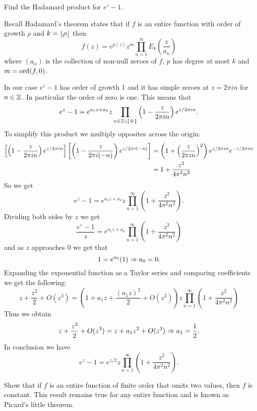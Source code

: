 \documentclass[12pt]{memoir}
\begin{document}
\begin{Ej}
   Find the Hadamard product for $e^z-1$.
\end{Ej}

\begin{ptcbr}
Recall Hadamard's theorem states that if $f$ is an entire function with order of growth $\rho$ and $k=\lfloor\rho\rfloor$ then 
$$f(z)=e^{p(z)}z^m\prod_{n=1}^{\infty}E_k\left(\frac{z}{a_n}\right)$$
where $(a_n)$ is the collection of non-null zeroes of $f$, $p$ has degree at most $k$ and $m=\operatorname{ord}(f,0)$.\par 
In our case $e^z-1$ has order of growth 1 and it has simple zeroes at $z=2\pi i n$ for $n\in\mathbb{Z}$. In particular the order of zero is one. This means that 
$$e^z-1=e^{a_1z+a_0}z\prod_{n\in\mathbb{Z}\setminus\{\,0\,\}}\left(1-\frac{z}{2\pi i n}\right)e^{z/2\pi i n}.$$
To simplify this product we multiply opposites across the origin:
\begin{align*}
\left\lbrack\left(1-\frac{z}{2\pi i n}\right)e^{z/2\pi i n}\right\rbrack\left\lbrack\left(1-\frac{z}{2\pi i (-n)}\right)e^{z/2\pi i (-n)}\right\rbrack&=\left(1+\left(\frac{z}{2\pi i n}\right)^2\right)e^{z/2\pi i n}e^{-z/2\pi i n}\\
&=1+\frac{z^2}{4\pi^2n^2}   
\end{align*}
So we get
$$e^z-1=e^{a_1z+a_0}z\prod_{n=1}^\infty\left(1+\frac{z^2}{4\pi^2n^2} \right).$$ 
Dividing both sides by $z$ we get 
$$\frac{e^z-1}{z}=e^{a_1z+a_0}\prod_{n=1}^\infty\left(1+\frac{z^2}{4\pi^2n^2} \right)$$
and as $z$ approaches $0$ we get that 
$$1=e^{a_0}(1)\Rightarrow a_0=0.$$
Expanding the exponential function as a Taylor series and comparing coefficients we get the following:
$$z+\frac{z^2}{2}+O(z^3)=(1+a_1z+\frac{(a_1z)^2}{2}+O(z^3))z\prod_{n=1}^\infty\left(1+\frac{z^2}{4\pi^2n^2} \right)$$
Thus we obtain 
$$z+\frac{z^2}{2}+O(z^3)=z+a_1z^2+O(z^3)\Rightarrow a_1=\frac{1}{2}.$$
In conclusion we have 
$$e^z-1=e^{z/2}z\prod_{n=1}^\infty\left(1+\frac{z^2}{4\pi^2n^2} \right).$$
\end{ptcbr}

\begin{Ej}
   Show that if $f$ is an entire function of finite order that omits two values, then $f$ is constant. This result remains true for any entire function and is known as Picard's little theorem.

\end{Ej}
\end{document}
